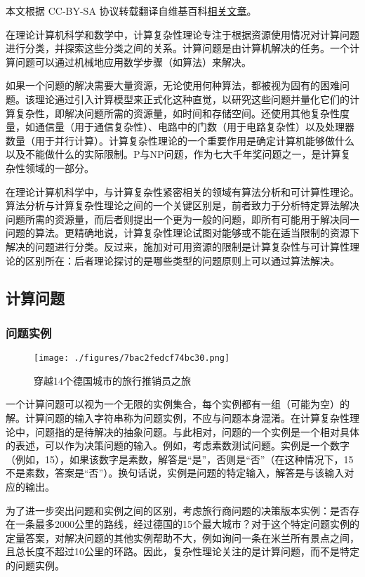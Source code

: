 
本文根据 CC-BY-SA 协议转载翻译自维基百科\href{https://en.wikipedia.org/wiki/Computational_complexity_theory}{相关文章}。

在理论计算机科学和数学中，计算复杂性理论专注于根据资源使用情况对计算问题进行分类，并探索这些分类之间的关系。计算问题是由计算机解决的任务。一个计算问题可以通过机械地应用数学步骤（如算法）来解决。

如果一个问题的解决需要大量资源，无论使用何种算法，都被视为固有的困难问题。该理论通过引入计算模型来正式化这种直觉，以研究这些问题并量化它们的计算复杂性，即解决问题所需的资源量，如时间和存储空间。还使用其他复杂性度量，如通信量（用于通信复杂性）、电路中的门数（用于电路复杂性）以及处理器数量（用于并行计算）。计算复杂性理论的一个重要作用是确定计算机能够做什么以及不能做什么的实际限制。P与NP问题，作为七大千年奖问题之一，是计算复杂性领域的一部分。

在理论计算机科学中，与计算复杂性紧密相关的领域有算法分析和可计算性理论。算法分析与计算复杂性理论之间的一个关键区别是，前者致力于分析特定算法解决问题所需的资源量，而后者则提出一个更为一般的问题，即所有可能用于解决同一问题的算法。更精确地说，计算复杂性理论试图对能够或不能在适当限制的资源下解决的问题进行分类。反过来，施加对可用资源的限制是计算复杂性与可计算性理论的区别所在：后者理论探讨的是哪些类型的问题原则上可以通过算法解决。
\subsection{计算问题}
\subsubsection{问题实例}  
\begin{figure}[ht]
\centering
\texttt{[image: ./figures/7bac2fedcf74bc30.png]}
\caption{穿越14个德国城市的旅行推销员之旅} \label{fig_JSFZ_1}
\end{figure}
一个计算问题可以视为一个无限的实例集合，每个实例都有一组（可能为空）的解。计算问题的输入字符串称为问题实例，不应与问题本身混淆。在计算复杂性理论中，问题指的是待解决的抽象问题。与此相对，问题的一个实例是一个相对具体的表述，可以作为决策问题的输入。例如，考虑素数测试问题。实例是一个数字（例如，15），如果该数字是素数，解答是“是”，否则是“否”（在这种情况下，15不是素数，答案是“否”）。换句话说，实例是问题的特定输入，解答是与该输入对应的输出。

为了进一步突出问题和实例之间的区别，考虑旅行商问题的决策版本实例：是否存在一条最多2000公里的路线，经过德国的15个最大城市？对于这个特定问题实例的定量答案，对解决问题的其他实例帮助不大，例如询问一条在米兰所有景点之间，且总长度不超过10公里的环路。因此，复杂性理论关注的是计算问题，而不是特定的问题实例。
